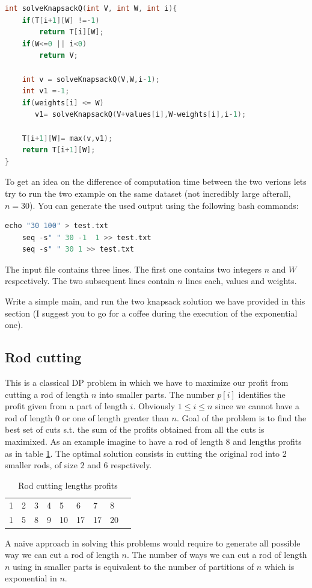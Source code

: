 \begin{lstlisting}[language=c++, caption="Binary knapsack problem -Memoized solution",label=list:knapqudratic]
int solveKnapsackQ(int V, int W, int i){
    if(T[i+1][W] !=-1)
        return T[i][W];
    if(W<=0 || i<0)
        return V;
    
    int v = solveKnapsackQ(V,W,i-1);
    int v1 =-1;
    if(weights[i] <= W)
       v1= solveKnapsackQ(V+values[i],W-weights[i],i-1);
    
    T[i+1][W]= max(v,v1);
    return T[i+1][W];
}
	\end{lstlisting}

To get an idea on the difference of computation time between the two verions lets try to run the two example on the same dataset (not incredibly large afterall, $n=30$). You can generate the used output using the following bash commands:

\begin{lstlisting}[language=c++, caption="Binary knapsack problem -Input generation",label=list:knapqudratic]
	echo "30 100" > test.txt	
	seq -s" " 30 -1  1 >> test.txt 
    seq -s" " 30 1 >> test.txt 
\end{lstlisting}
The input file contains three lines. The first one contains two integers $n$ and $W$ respectively.
The two subsequent lines contain $n$ lines each, values and weights.

Write a simple main, and run the two knapsack solution we have provided in this section (I suggest you to go for a coffee during the execution of the exponential one).


\subsection{Rod cutting}
This is a classical DP problem in which we have to maximize our profit from cutting a rod of length $n$ into smaller parts.
The number $p[i]$ identifies the profit given from a part of length $i$. Obviously $1 \leq i \leq n$ since we cannot have a rod of length $0$ or one of length greater than $n$.
Goal of the problem is to find the best set of cuts s.t. the sum of the profits obtained from all the cuts is maximixed.
As an example imagine to have a rod of length $8$ and lengths profits as in table \ref{rodcut}. The optimal solution consists in cutting the original rod into 2 smaller rods, of size $2$ and $6$ respctively. 
\begin{table}[]
\centering
\caption{Rod cutting lengths profits}
\label{rodcut}
\begin{tabular}{lllllllll}
 1&  2&  3&  4&  5&   6&   7&  8&\\
 1&  5&  8&  9&  10&  17&  17& 20& 
\end{tabular}
\end{table}
A naive approach in solving this problems would require to generate all possible way we can cut a rod of length $n$. The number of ways we can cut a rod of length $n$ using in smaller parts is equivalent to the number of partitions of $n$ which is exponential in $n$.

